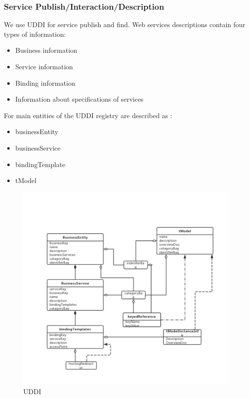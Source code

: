\documentclass[runningheads]{llncs}
\begin{document}
\subsubsection{Service Publish/Interaction/Description}
We use UDDI for service publish and find. Web services descriptions contain four types of information:
\begin{itemize}
    \item Business information
    \item Service information
    \item Binding information
    \item Information about specifications of services
\end{itemize}
For main entities of the UDDI registry are described as :
\begin{itemize}
    \item businessEntity
    \item businessService
    \item bindingTemplate
    \item tModel
\end{itemize}
\begin{figure}[H]
    \centering %
    \includegraphics[width=1.0\textwidth]{./figure/MWZH/UDDIInformationModel} %
    \caption{UDDI} %
    \label{wsc} %
\end{figure}
\end{document}
